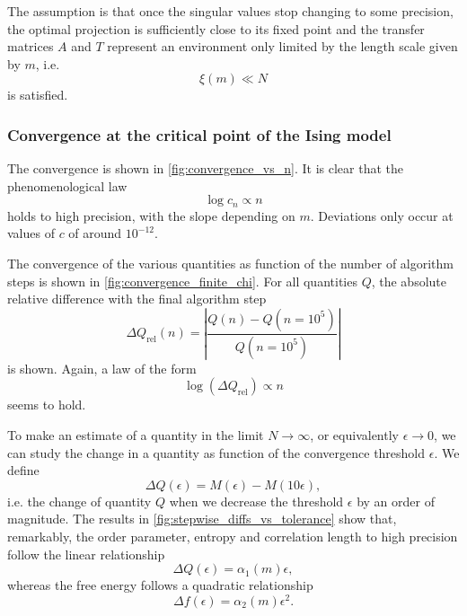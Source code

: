 The assumption is that once the singular values stop changing to some precision, the optimal projection is sufficiently
close to its fixed point and the transfer matrices $A$ and $T$ represent an environment only limited by the length scale
given by $m$, i.e.
\begin{equation}
  \xi(m) \ll N
\end{equation}
is satisfied.

\subsubsection{Convergence at the critical point of the Ising model}
The convergence is shown in \autoref{fig:convergence_vs_n}. It is clear that the
phenomenological law
\begin{equation}\label{eq:convergence_vs_n_semilogarithmic_law}
  \log c_n \propto n
\end{equation}
holds to high precision, with the slope depending on $m$.
Deviations only occur at values of $c$ of around $10^{-12}$.

The convergence of the various quantities as function of the number of algorithm steps is shown in
\autoref{fig:convergence_finite_chi}. For all quantities $Q$, the absolute relative difference
with the final algorithm step
\begin{equation}\label{eq:abs_rel_diff}
  \Delta Q_{\text{rel}}(n) = \left| \frac{Q(n) - Q(n = 10^5)}{Q(n = 10^5)} \right|
\end{equation}
is shown. Again, a law of the form
\begin{equation}\label{eq:abs_rel_diff_vs_n_semilogarithmic_law}
  \log(\Delta Q_{\text{rel}}) \propto n
\end{equation}
seems to hold.

To make an estimate of a quantity in the limit $N \to \infty$, or equivalently $\epsilon \to 0$,
we can study the change in a quantity as function of the convergence threshold $\epsilon$. We define
\begin{equation}\label{eq:stepwise_difference_epsilon}
  \Delta Q(\epsilon) = M(\epsilon) - M(10\epsilon),
\end{equation}
i.e. the change of quantity $Q$ when we decrease the threshold $\epsilon$ by an order of magnitude. The results in
\autoref{fig:stepwise_diffs_vs_tolerance} show that, remarkably, the order parameter, entropy and correlation length
to high precision follow the linear relationship
\begin{equation}\label{eq:stepwise_difference_linear}
  \Delta Q(\epsilon) = \alpha_1(m) \epsilon,
\end{equation}
whereas the free energy follows a quadratic relationship
\begin{equation}\label{eq:stepwise_difference_quadratic}
  \Delta f(\epsilon) = \alpha_2(m) \epsilon^2.
\end{equation}

